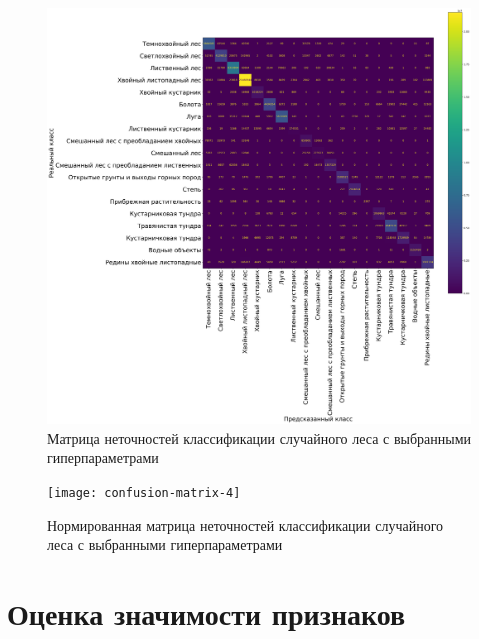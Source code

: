 \documentclass[14pt, a4paper, oneside]{extarticle}
\begin{document}
\begin{figure}[H]
    \caption{Матрица неточностей классификации случайного леса с выбранными гиперпараметрами}
    \centering
    \includegraphics[scale=0.25]{confusion-matrix-3}
\end{figure}

\begin{figure}[H]
    \caption{Нормированная матрица неточностей классификации случайного леса с выбранными гиперпараметрами}
    \centering
    \texttt{[image: confusion-matrix-4]}
\end{figure}
\newpage

\section{Оценка значимости признаков}

\newpage

\end{document}
